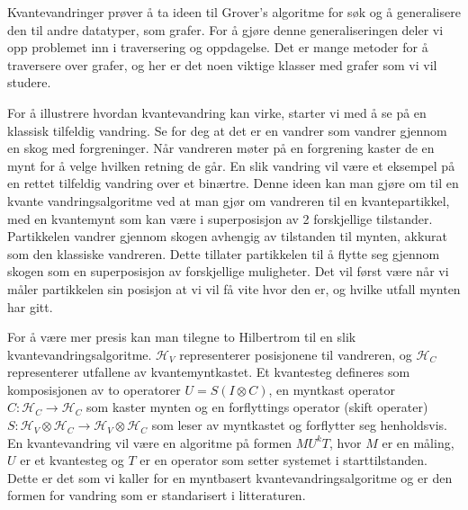     Kvantevandringer prøver å ta ideen til Grover's algoritme for søk og å generalisere den til andre datatyper, som grafer. For å gjøre denne generaliseringen deler vi opp problemet inn i traversering og oppdagelse. Det er mange metoder for å traversere over grafer, og her er det noen viktige klasser med grafer som vi vil studere.



    For å illustrere hvordan kvantevandring kan virke, starter vi med å se på en klassisk tilfeldig vandring. Se for deg at det er en vandrer som vandrer gjennom en skog med forgreninger. Når vandreren møter på en forgrening kaster de en mynt for å velge hvilken retning de går. En slik vandring vil være et eksempel på en rettet tilfeldig vandring over et binærtre. Denne ideen kan man gjøre om til en kvante vandringsalgoritme ved at man gjør om vandreren til en kvantepartikkel, med en kvantemynt som kan være i superposisjon av 2 forskjellige tilstander. Partikkelen vandrer gjennom skogen avhengig av tilstanden til mynten, akkurat som den klassiske vandreren. Dette tillater partikkelen til å flytte seg gjennom skogen som en superposisjon av forskjellige muligheter. Det vil først være når vi måler partikkelen sin posisjon at vi vil få vite hvor den er, og hvilke utfall mynten har gitt.

    For å være mer presis kan man tilegne to Hilbertrom til en slik kvantevandringsalgoritme. $\mathcal{H}_V$ representerer posisjonene til vandreren, og $\mathcal{H}_C$ representerer utfallene av kvantemyntkastet. Et kvantesteg defineres som komposisjonen av to operatorer $U=S(I\otimes C)$, en myntkast operator $C:\mathcal{H}_C\rightarrow\mathcal{H}_C$ som kaster mynten og en forflyttings operator (skift operater) $S:\mathcal{H}_V\otimes\mathcal{H}_C\rightarrow\mathcal{H}_V\otimes\mathcal{H}_C$ som leser av myntkastet og forflytter seg henholdsvis. En kvantevandring vil være en algoritme på formen $MU^kT$, hvor $M$ er en måling, $U$ er et kvantesteg og $T$ er en operator som setter systemet i starttilstanden. Dette er det som vi kaller for en myntbasert kvantevandringsalgoritme og er den formen for vandring som er standarisert i litteraturen.

